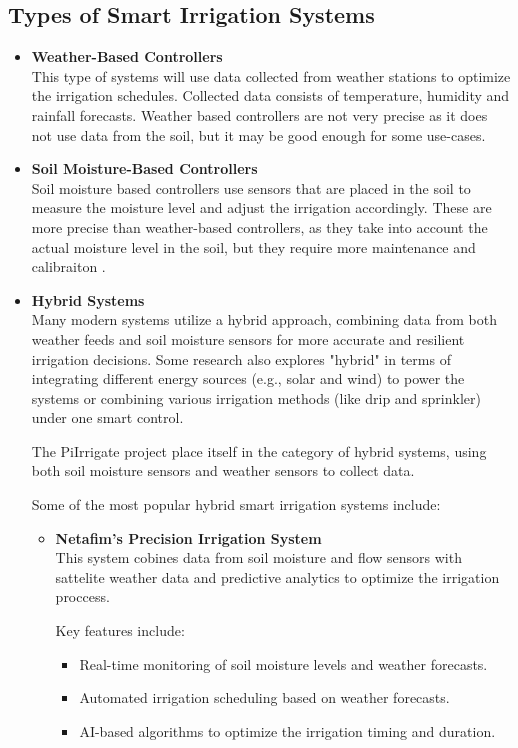 \subsection{Types of Smart Irrigation Systems}
\begin{itemize}
  \item \textbf{Weather-Based Controllers} \\
  This type of systems will use data collected from weather stations to optimize the irrigation schedules.
  Collected data consists of temperature, humidity and rainfall forecasts. Weather based controllers are not
  very precise as it does not use data from the soil, but it may be good enough for some use-cases.

  \item \textbf{Soil Moisture-Based Controllers} \\
  Soil moisture based controllers use sensors that are placed in the soil to measure
  the moisture level and adjust the irrigation accordingly.
  These are more precise than weather-based controllers, as they take into account
  the actual moisture level in the soil, but they require more maintenance and calibraiton
  \cite{smartIrrigationTechnologyControllersAndSensors}.

  \item \textbf{Hybrid Systems} \\
  Many modern systems utilize a hybrid approach, combining data from both
  weather feeds and soil moisture sensors for more accurate and resilient 
  irrigation decisions. Some research also explores "hybrid" in terms of 
  integrating different energy sources (e.g., solar and wind) to power the systems or 
  combining various 
  irrigation methods (like drip and sprinkler) under one smart control\cite{soilBasedIrrigation}.

  The PiIrrigate project place itself in the category of hybrid systems, using both
  soil moisture sensors and weather sensors to collect data.
  
  Some of the most popular hybrid smart irrigation systems include:
  \begin{itemize}
    \item \textbf{Netafim's Precision Irrigation System} \\
    This system cobines data from soil moisture and flow sensors with sattelite weather data and predictive
    analytics to optimize the irrigation proccess.
    
    Key features include:
    \begin{itemize}
      \item Real-time monitoring of soil moisture levels and weather forecasts.
      \item Automated irrigation scheduling based on weather forecasts.
      \item AI-based algorithms to optimize the irrigation timing and duration.
    \end{itemize}


\end{itemize}
\end{itemize}
